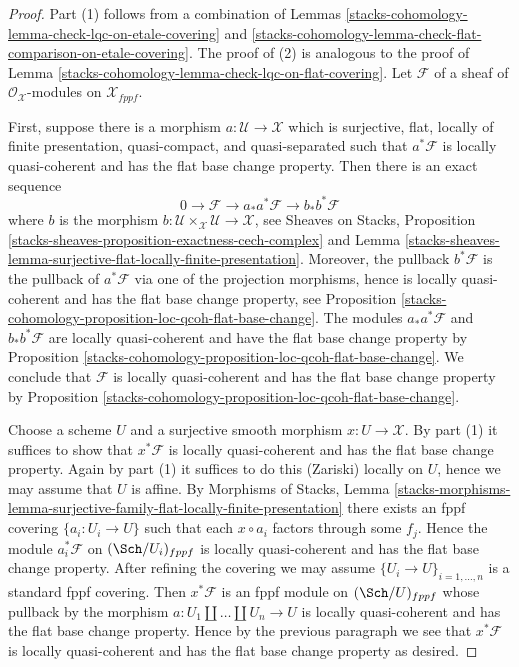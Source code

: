 \begin{proof}
Part (1) follows from a combination of
Lemmas \ref{stacks-cohomology-lemma-check-lqc-on-etale-covering} and
\ref{stacks-cohomology-lemma-check-flat-comparison-on-etale-covering}.
The proof of (2) is analogous to the proof of
Lemma \ref{stacks-cohomology-lemma-check-lqc-on-flat-covering}.
Let $\mathcal{F}$ of a sheaf of $\mathcal{O}_\mathcal{X}$-modules
on $\mathcal{X}_{fppf}$.

\medskip\noindent
First, suppose there is a morphism $a : \mathcal{U} \to \mathcal{X}$
which is surjective, flat, locally of finite presentation, quasi-compact,
and quasi-separated such that $a^*\mathcal{F}$ is locally quasi-coherent
and has the flat base change property.
Then there is an exact sequence
$$
0 \to \mathcal{F} \to a_*a^*\mathcal{F} \to b_*b^*\mathcal{F}
$$
where $b$ is the morphism
$b : \mathcal{U} \times_\mathcal{X} \mathcal{U} \to \mathcal{X}$, see
Sheaves on Stacks, Proposition
\ref{stacks-sheaves-proposition-exactness-cech-complex} and
Lemma \ref{stacks-sheaves-lemma-surjective-flat-locally-finite-presentation}.
Moreover, the pullback $b^*\mathcal{F}$ is the pullback of $a^*\mathcal{F}$
via one of the projection morphisms, hence is locally quasi-coherent
and has the flat base change property, see
Proposition \ref{stacks-cohomology-proposition-loc-qcoh-flat-base-change}.
The modules $a_*a^*\mathcal{F}$ and $b_*b^*\mathcal{F}$ are locally
quasi-coherent and have the flat base change property by
Proposition \ref{stacks-cohomology-proposition-loc-qcoh-flat-base-change}.
We conclude that $\mathcal{F}$ is locally quasi-coherent and
has the flat base change property by
Proposition \ref{stacks-cohomology-proposition-loc-qcoh-flat-base-change}.

\medskip\noindent
Choose a scheme $U$ and a surjective smooth morphism $x : U \to \mathcal{X}$.
By part (1) it suffices to show that $x^*\mathcal{F}$ is locally
quasi-coherent and has the flat base change property.
Again by part (1) it suffices to do this (Zariski) locally on $U$,
hence we may assume that $U$ is affine. By
Morphisms of Stacks, Lemma
\ref{stacks-morphisms-lemma-surjective-family-flat-locally-finite-presentation}
there exists an fppf covering $\{a_i : U_i \to U\}$ such that
each $x \circ a_i$ factors through some $f_j$. Hence the module
$a_i^*\mathcal{F}$ on $(\Sch/U_i)_{fppf}$
is locally quasi-coherent and has the flat base change property.
After refining the covering we may assume $\{U_i \to U\}_{i = 1, \ldots, n}$
is a standard fppf covering. Then $x^*\mathcal{F}$ is an fppf
module on $(\Sch/U)_{fppf}$ whose pullback by the morphism
$a : U_1 \amalg \ldots \amalg U_n \to U$ is locally quasi-coherent
and has the flat base change property.
Hence by the previous paragraph we see that $x^*\mathcal{F}$ is locally
quasi-coherent and has the flat base change property as desired.
\end{proof}

